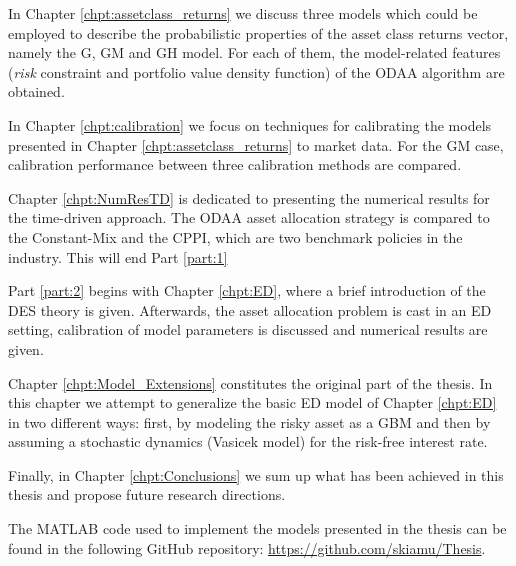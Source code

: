 In Chapter \ref{chpt:assetclass_returns} we discuss three models which could be employed to describe the probabilistic properties of the asset class returns vector, namely the \gls{G}, \gls{GM} and \gls{GH} model. For each of them, the model-related features (\textit{risk} constraint and portfolio value density function) of the \gls{ODAA} algorithm are obtained.

In Chapter \ref{chpt:calibration} we focus on techniques for calibrating the models presented in Chapter \ref{chpt:assetclass_returns} to market data. For the \gls{GM} case, calibration performance between three calibration methods are compared.


Chapter \ref{chpt:NumResTD} is dedicated to presenting the numerical results for the time-driven approach. The \gls{ODAA} asset allocation strategy is compared to the Constant-Mix and the CPPI, which are two benchmark policies in the industry. This will end Part \ref{part:1}

Part \ref{part:2} begins with Chapter \ref{chpt:ED}, where a brief introduction of the \gls{DES} theory is given. Afterwards, the asset allocation problem is cast in an \gls{ED} setting, calibration of model parameters is discussed and numerical results are given. 

Chapter \ref{chpt:Model_Extensions} constitutes the original part of the thesis. In this chapter we attempt to generalize the basic \gls{ED} model of Chapter \ref{chpt:ED} in two different ways: first, by modeling the risky asset as a \gls{GBM} and then by assuming a stochastic dynamics (Vasicek model) for the risk-free interest rate. 


Finally, in Chapter \ref{chpt:Conclusions} we sum up what has been achieved in this thesis and propose future research directions.

The MATLAB code used to implement the models presented in the thesis can be found in the following GitHub repository: \url{https://github.com/skiamu/Thesis}. 











